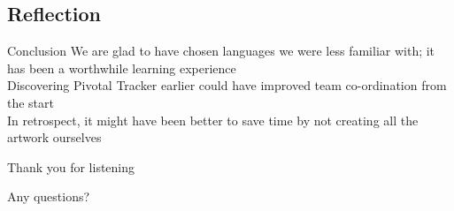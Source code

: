 \documentclass{beamer}
\begin{document}
\subsection{Reflection}

\begin{frame}{Conclusion}
  We are glad to have chosen languages we were less familiar with; it has been a worthwhile learning experience\\
  \vspace{\baselineskip}
  Discovering Pivotal Tracker earlier could have improved team co-ordination from the start\\
  \vspace{\baselineskip}
  In retrospect, it might have been better to save time by not creating all the artwork ourselves
\end{frame}

\begin{frame}{Thank you for listening}
  \begin{center}
    Any questions?
  \end{center}
\end{frame}
\end{document}
